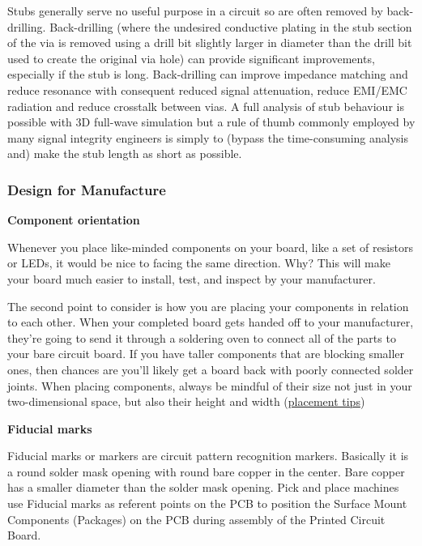 \documentclass[final]{cubedoc}
\begin{document}
	Stubs generally serve no useful purpose in a circuit so are often removed by back-drilling. Back-drilling (where the undesired conductive plating in the stub section of the via is removed using a drill bit slightly larger in diameter than the drill bit used to create the original via hole) can provide significant improvements, especially if the stub is long. Back-drilling can improve impedance matching and reduce resonance with consequent reduced signal attenuation, reduce EMI/EMC radiation and reduce crosstalk between vias. A full analysis of stub behaviour is possible with 3D full-wave simulation but a rule of thumb commonly employed by many signal integrity engineers is simply to (bypass the time-consuming analysis and) make the stub length as short as possible.
	
	
	\subsubsection{Design for Manufacture}
	
	\textbf{Component orientation}
	
	Whenever you place like-minded components on your board, like a set of resistors or LEDs, it would be nice to facing the same direction. Why? This will make your board much easier to install, test, and inspect by your manufacturer.
	
	The second point to consider is how you are placing your components in relation to each other. When your completed board gets handed off to your manufacturer, they’re going to send it through a soldering oven to connect all of the parts to your bare circuit board. If you have taller components that are blocking smaller ones, then chances are you’ll likely get a board back with poorly connected solder joints. When placing components, always be mindful of their size not just in your two-dimensional space, but also their height and width (\href{https://www.autodesk.com/products/eagle/blog/top-10-pcb-component-placement-tips-pcb-beginner/}{placement tips})
	
	\textbf{Fiducial marks}
	
	Fiducial marks or markers are circuit pattern recognition markers. Basically it is a round solder mask opening with round bare copper in the center. Bare copper has a smaller diameter than the solder mask opening. Pick and place machines use Fiducial marks as referent points on the PCB to position the Surface Mount Components (Packages) on the PCB during assembly of the Printed Circuit Board.
	
\end{document}
